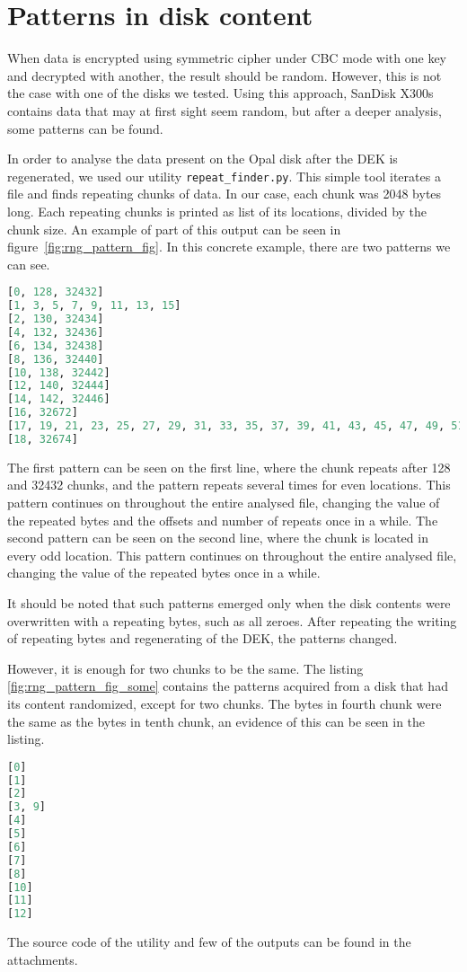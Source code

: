 \appendix

\chapter{Patterns in disk content}
\label{appendix:rng_pattern}

When data is encrypted using symmetric cipher under CBC mode with one key and decrypted with another, the result should be random.
However, this is not the case with one of the disks we tested. Using this approach, SanDisk X300s contains data that may at first sight seem random, but after a deeper analysis, some patterns can be found.

In order to analyse the data present on the Opal disk after the DEK is regenerated, we used our utility \verb|repeat_finder.py|. This simple tool iterates a file and finds repeating chunks of data. In our case, each chunk was 2048 bytes long. Each repeating chunks is printed as list of its locations, divided by the chunk size. An example of part of this output can be seen in figure~\ref{fig:rng_pattern_fig}. In this concrete example, there are two patterns we can see.

\begin{lstlisting}[caption={Found patterns on zeroed disk},label={fig:rng_pattern_fig},language=Python]
[0, 128, 32432]
[1, 3, 5, 7, 9, 11, 13, 15]
[2, 130, 32434]
[4, 132, 32436]
[6, 134, 32438]
[8, 136, 32440]
[10, 138, 32442]
[12, 140, 32444]
[14, 142, 32446]
[16, 32672]
[17, 19, 21, 23, 25, 27, 29, 31, 33, 35, 37, 39, 41, 43, 45, 47, 49, 51, 53, 55]
[18, 32674]
    \end{lstlisting}
The first pattern can be seen on the first line, where the chunk repeats after 128 and 32432 chunks, and the pattern repeats several times for even locations. This pattern continues on throughout the entire analysed file, changing the value of the repeated bytes and the offsets and number of  repeats  once in a while.
The second pattern can be seen on the second line, where the chunk is located in every odd location. This pattern continues on throughout the entire analysed file, changing the value of the repeated bytes once in a while.

It should be noted that such patterns emerged only when the disk contents were overwritten with a repeating bytes, such as all zeroes. After repeating the writing of repeating bytes and regenerating of the DEK, the patterns changed. 

However, it is enough for two chunks to be the same. The listing \ref{fig:rng_pattern_fig_some} contains the patterns acquired from a disk that had its content randomized, except for two chunks. The bytes in fourth chunk were the same as the bytes in tenth chunk, an evidence of this can be seen in the listing.

\begin{lstlisting}[caption={Found patterns on disk with two same chunks},label={fig:rng_pattern_fig_some},language=Python]
[0]
[1]
[2]
[3, 9]
[4]
[5]
[6]
[7]
[8]
[10]
[11]
[12]
\end{lstlisting}


The source code of the utility and few of the outputs can be found in the attachments.